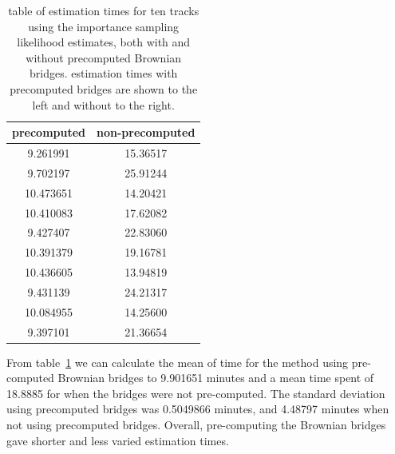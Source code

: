 \begin{table}[H]
    \centering
    \begin{tabular}{c|c}
        precomputed & non-precomputed \\
        \hline
        9.261991 & 15.36517 \\
        9.702197 & 25.91244 \\
        10.473651 & 14.20421 \\
        10.410083 & 17.62082 \\
        9.427407 & 22.83060 \\
        10.391379 & 19.16781 \\
        10.436605 & 13.94819 \\
        9.431139 & 24.21317 \\
        10.084955 & 14.25600 \\
        9.397101  & 21.36654 \\
    \end{tabular}
    \caption[table of estimation times with and without pre-computation of Brownian bridges]{table of estimation times for ten tracks using the importance sampling likelihood estimates, both with and without precomputed Brownian bridges. estimation times with precomputed bridges are shown to the left and without to the right.}
    \label{tab: times}
\end{table}


From table~\ref{tab: times} we can calculate the mean of time for the method using pre-computed Brownian bridges to 9.901651 minutes and a mean time spent of 18.8885 for when the bridges were not pre-computed. The standard deviation using precomputed bridges was 0.5049866 minutes, and 4.48797 minutes when not using precomputed bridges. Overall, pre-computing the Brownian bridges gave shorter and less varied estimation times.




